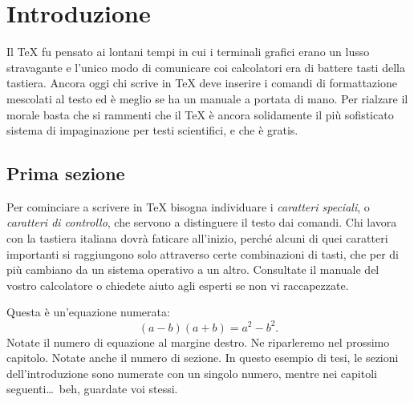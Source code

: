 


\chapter{Introduzione}

Il \TeX{} fu pensato ai lontani tempi in cui i terminali
grafici erano un lusso stravagante e l'unico modo di
comunicare coi calcolatori era di battere tasti della
tastiera. Ancora oggi chi scrive in \TeX{} deve inserire i
comandi di formattazione mescolati al testo ed è meglio
se ha un manuale a portata di mano. Per rialzare
il morale basta che si rammenti che il \TeX{} è ancora
solidamente il più sofisticato sistema di impaginazione
per testi scientifici, e che è gratis.

\section{Prima sezione}

Per cominciare a scrivere in \TeX{} bisogna individuare i
\emph{caratteri speciali}, o \emph{caratteri di
controllo}, che servono a
distinguere il testo dai comandi. Chi lavora con la
tastiera italiana dovrà faticare
all'inizio, perché alcuni di quei caratteri importanti
si raggiungono solo attraverso certe combinazioni di
tasti, che per di più cambiano da un sistema
operativo a un altro. Consultate
il manuale del vostro calcolatore o chiedete aiuto agli
esperti se non vi raccapezzate.

Questa è un'equazione numerata:
\begin{equation}\label{prodottoNotevole}
  (a-b)(a+b)=a^2-b^2.
\end{equation}
Notate il numero di equazione al margine destro. Ne riparleremo nel prossimo capitolo. Notate anche il numero di sezione. In questo esempio di tesi, le sezioni dell'introduzione sono numerate con un singolo numero, mentre nei capitoli seguenti\dots\ beh, guardate voi stessi.

